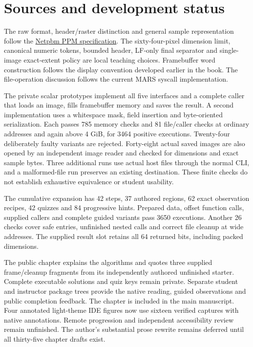 \section{Sources and development status}
The raw format, header/raster distinction and general sample representation follow the
\href{https://netpbm.sourceforge.net/doc/ppm.html}{Netpbm PPM specification}. The
sixty-four-pixel dimension limit, canonical numeric tokens, bounded header, LF-only
final separator and single-image exact-extent policy are local teaching choices.
Framebuffer word construction follows the display convention developed earlier in the
book. The file-operation discussion follows the current MARS syscall implementation.

The private scalar prototypes implement all five interfaces and a complete caller that
loads an image, fills framebuffer memory and saves the result. A second implementation uses a whitespace mask, field insertion
and byte-oriented serialization. Each passes 785 memory checks and 81 file/caller checks
at ordinary addresses and again above 4 GiB, for 3464 positive executions. Twenty-four
deliberately faulty variants are rejected. Forty-eight actual saved images are also
opened by an independent image reader and checked for dimensions and exact sample bytes.
Three additional runs use actual host files through the normal CLI, and a malformed-file
run preserves an existing destination. These finite checks do not establish exhaustive
equivalence or student usability.

The cumulative expansion has 42 steps, 37 authored regions, 62 exact observation
recipes, 42 quizzes and 84 progressive hints. Prepared data, offset function calls,
supplied callers and complete guided variants pass 3650 executions. Another 26 checks
cover safe entries, unfinished nested calls and correct file cleanup at wide addresses.
The supplied result slot retains all 64 returned bits, including packed dimensions.

The public chapter explains the algorithms and quotes three supplied frame/cleanup
fragments from its independently authored unfinished starter. Complete executable
solutions and quiz keys remain private. Separate student and instructor package trees
provide the native reading, guided observations and public completion feedback. The
chapter is included in the main manuscript. Four annotated light-theme IDE figures now use sixteen verified captures with native
annotations. Remote progression and independent accessibility review remain unfinished. The author's
substantial prose rewrite remains deferred until all thirty-five chapter drafts exist.
